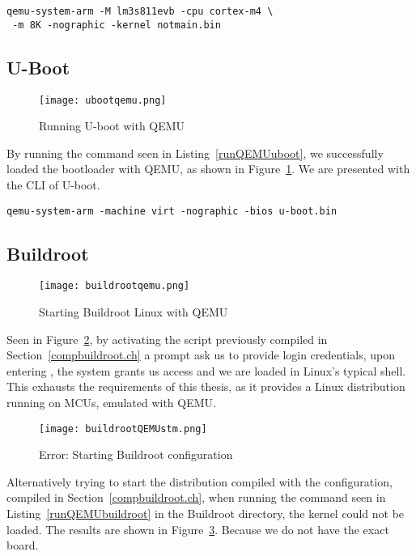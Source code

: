 \begin{lstlisting}[style=SH, caption=Running sample code with QEMU, label=sampleqemu]
qemu-system-arm -M lm3s811evb -cpu cortex-m4 \
 -m 8K -nographic -kernel notmain.bin
\end{lstlisting}

\subsection{U-Boot}
\begin{figure}[H]
\centering
\texttt{[image: ubootqemu.png]}
\caption{Running U-boot with QEMU}
\label{ubootqemu}
\end{figure}

By running the command seen in Listing~\ref{runQEMUuboot}, we successfully loaded the bootloader with QEMU, as shown in Figure~\ref{ubootqemu}. We are presented with the CLI of U-boot.

\begin{lstlisting}[style=SH, caption=Running U-Boot with QEMU, label=runQEMUuboot]
qemu-system-arm -machine virt -nographic -bios u-boot.bin
\end{lstlisting}

\subsection{Buildroot} \label{success}
\begin{figure}[H]
\centering
\texttt{[image: buildrootqemu.png]}
\caption{Starting Buildroot Linux with QEMU}
\label{buildrootqemu}
\end{figure}

Seen in Figure~\ref{buildrootqemu}, by activating the  script previously compiled in Section~\ref{compbuildroot.ch} a prompt ask us to provide login credentials, upon entering , the system grants us access and we are loaded in Linux's typical  shell. This exhausts the requirements of this thesis, as it provides a Linux distribution running on MCUs, emulated with QEMU.

\begin{figure}[H]
\centering
\texttt{[image: buildrootQEMUstm.png]}
\caption{Error: Starting Buildroot  configuration}
\label{fig:buildrootqemustm}
\end{figure}

Alternatively trying to start the distribution compiled with the  configuration, compiled in Section~\ref{compbuildroot.ch}, when running the command seen in Listing~\ref{runQEMUbuildroot} in the Buildroot directory, the kernel could not be loaded. The results are shown in Figure~\ref{fig:buildrootqemustm}. Because we do not have the exact board.

